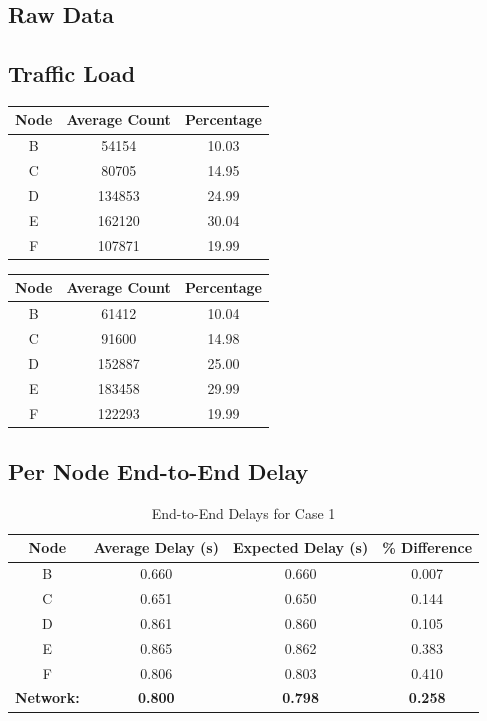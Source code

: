 \documentclass{article}
\begin{document}
\newpage
\begin{appendices}
\section{Raw Data}
\label{appendix:Data}

\subsection*{Traffic Load}
\begin{minipage}{0.5\textwidth}
\centering
\begin{tabular}{|c|c|c|} \hline
\textbf{Node} & \textbf{Average Count} & \textbf{Percentage} \\ \hline
B & 54154 & 10.03 \\ \hline
C & 80705 & 14.95 \\ \hline
D & 134853 & 24.99 \\ \hline
E & 162120 & 30.04 \\ \hline
F & 107871 & 19.99 \\ \hline
\end{tabular}
\label{tab:appTrafficA}
\end{minipage}
\begin{minipage}{0.5\textwidth}
\centering
\begin{tabular}{|c|c|c|} \hline
\textbf{Node} & \textbf{Average Count} & \textbf{Percentage} \\ \hline
B & 61412 & 10.04 \\ \hline
C & 91600 & 14.98 \\ \hline
D & 152887 & 25.00 \\ \hline
E & 183458 & 29.99 \\ \hline
F & 122293 & 19.99 \\ \hline
\end{tabular}
\label{tab:appTrafficB}
\end{minipage}

\subsection*{Per Node End-to-End Delay}
\begin{table}[h!]
\centering
\begin{tabular}{|c|c|c|c|} \hline
\textbf{Node} & \textbf{Average Delay (s)} & \textbf{Expected Delay (s)} & \textbf{\% Difference} \\ \hline
B & 0.660 & 0.660 & 0.007 \\ \hline
C & 0.651 & 0.650 & 0.144 \\ \hline
D & 0.861 & 0.860 & 0.105 \\ \hline
E & 0.865 & 0.862 & 0.383 \\ \hline
F & 0.806 & 0.803 & 0.410 \\ \hline
\textbf{Network:} & \textbf{0.800} & \textbf{0.798} & \textbf{0.258} \\ \hline
\end{tabular}
\caption{End-to-End Delays for Case 1}
\label{tab:nodeDelayA}
\end{table}


\end{appendices}
\end{document}
